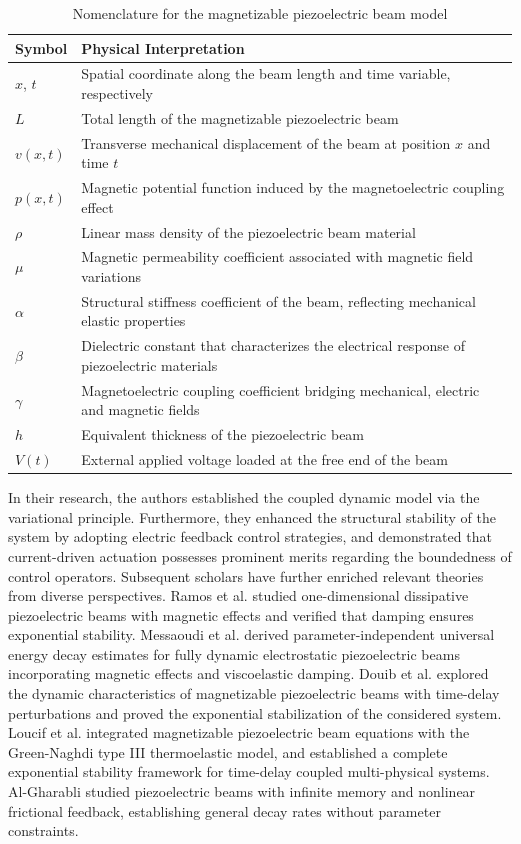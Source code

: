\documentclass[12pt,reqno]{article}
\begin{document}
\begin{table}[htbp]\label{table1}
  \centering
  \caption{Nomenclature for the magnetizable piezoelectric beam model}
  \label{tab:nomenclature}
  \begin{tabular}{ll}
    \toprule
    Symbol & Physical Interpretation \\
    \midrule
    $x$, $t$ & Spatial coordinate along the beam length and time variable, respectively \\
    $L$ & Total length of the magnetizable piezoelectric beam \\
    $v(x,t)$ & Transverse mechanical displacement of the beam at position $x$ and time $t$ \\
    $p(x,t)$ & Magnetic potential function induced by the magnetoelectric coupling effect \\
    $\rho$ & Linear mass density of the piezoelectric beam material \\
    $\mu$ & Magnetic permeability coefficient associated with magnetic field variations \\
    $\alpha$ & Structural stiffness coefficient of the beam, reflecting mechanical elastic properties \\
    $\beta$ & Dielectric constant that characterizes the electrical response of piezoelectric materials \\
    $\gamma$ & Magnetoelectric coupling coefficient bridging mechanical, electric and magnetic fields \\
    $h$ & Equivalent thickness of the piezoelectric beam \\
    $V(t)$ & External applied voltage loaded at the free end of the beam \\
    \bottomrule
  \end{tabular}
\end{table}
In their research, the authors established the coupled dynamic model via the variational principle. Furthermore, they enhanced the structural stability of the system by adopting electric feedback control strategies, and demonstrated that current-driven actuation possesses prominent merits regarding the boundedness of control operators. Subsequent scholars have further enriched relevant theories from diverse perspectives. Ramos et al. \cite{MR3808160} studied one-dimensional dissipative piezoelectric beams with magnetic effects and verified that damping ensures exponential stability. Messaoudi et al. \cite{MR4853207} derived parameter-independent universal energy decay estimates for fully dynamic electrostatic piezoelectric beams incorporating magnetic effects and viscoelastic damping. Douib et al. \cite{MR4831270} explored the dynamic characteristics of magnetizable piezoelectric beams with time-delay perturbations and proved the exponential stabilization of the considered system. Loucif et al. \cite{MR4970606} integrated magnetizable piezoelectric beam equations with the Green-Naghdi type III thermoelastic model, and established a complete exponential stability framework for time-delay coupled multi-physical systems. Al-Gharabli \cite{MR4901041} studied piezoelectric beams with infinite memory and nonlinear frictional feedback, establishing general decay rates without parameter constraints.
	
\end{document}
